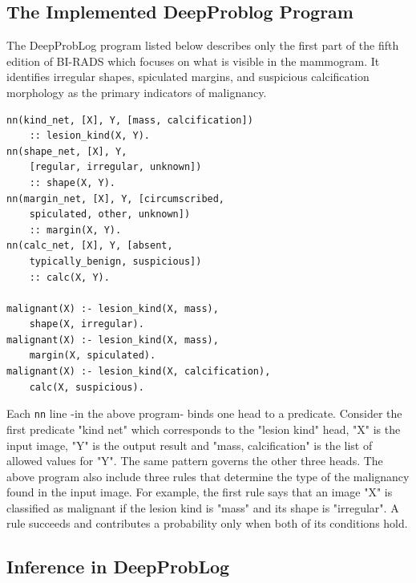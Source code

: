 \subsection{The Implemented DeepProblog Program}
\label{sec:knowledge}
\label{sec:problog}
The DeepProbLog program listed below describes only the first part of the fifth edition of BI-RADS which focuses on what is visible in the mammogram. It identifies irregular shapes, spiculated margins, and suspicious calcification morphology as the primary indicators of malignancy. 
\begin{lstlisting}
nn(kind_net, [X], Y, [mass, calcification])
    :: lesion_kind(X, Y).
nn(shape_net, [X], Y,
    [regular, irregular, unknown])
    :: shape(X, Y).
nn(margin_net, [X], Y, [circumscribed,
    spiculated, other, unknown])
    :: margin(X, Y).
nn(calc_net, [X], Y, [absent,
    typically_benign, suspicious])
    :: calc(X, Y).

malignant(X) :- lesion_kind(X, mass),
    shape(X, irregular).
malignant(X) :- lesion_kind(X, mass),
    margin(X, spiculated).
malignant(X) :- lesion_kind(X, calcification),
    calc(X, suspicious).
\end{lstlisting}
 Each \texttt{nn} line -in the above program- binds one head to a predicate. Consider the first predicate "kind net" which corresponds to the "lesion kind" head, "X" is the input image, 
"Y" is the output result  and
"mass, calcification" is the list of allowed values for "Y". The same pattern governs the other three heads. 
The above program also include three rules that determine the type of the malignancy found in the input image. For example, the first rule says that an image "X" is classified as malignant if the  lesion kind is "mass" and its shape is "irregular". A rule succeeds and contributes a  probability only when both of its conditions hold.


\subsection{Inference in DeepProbLog}
\label{sec:inference}

